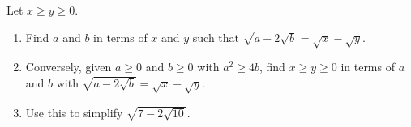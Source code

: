 Let $x\ge y\ge0$.
\begin{enumerate}
\item[(a)] Find $a$ and $b$ in terms of $x$ and $y$ such that $\sqrt{a-2\sqrt b}=\sqrt x-\sqrt y$.
\item[(b)] Conversely, given $a\ge0$ and $b\ge0$ with $a^2\ge4b$, find $x\ge y\ge0$ in terms of $a$ and $b$ with $\sqrt{a-2\sqrt b}=\sqrt x-\sqrt y$.
\item[(c)] Use this to simplify $\sqrt{7-2\sqrt{10}}$.
\end{enumerate}

